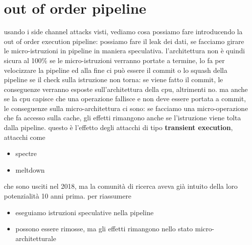 \documentclass[12pt, oneside]{extbook} %
\begin{document}
\section{out of order pipeline}
usando i side channel attacks visti, vediamo cosa possiamo fare introducendo la out of order execution pipeline: possiamo fare il leak dei dati, se facciamo girare le micro-istruzioni in pipeline in maniera speculativa. l'architettura non è quindi sicura al 100\% se le micro-istruzioni verranno portate a termine, lo fa per velocizzare la pipeline ed alla fine ci può essere il commit o lo squash della pipeline se il check sulla istruzione non torna: se viene fatto il commit, le conseguenze verranno esposte sull'architettura della cpu, altrimenti no. ma anche se la cpu capisce che una operazione fallisce e non deve essere portata a commit, le conseguenze sulla micro-architettura ci sono: se facciamo una micro-operazione che fa accesso sulla cache, gli effetti rimangono anche se l'istruzione viene tolta dalla pipeline. questo è l'effetto degli attacchi di tipo \textbf{transient execution}, attacchi come
\begin{itemize}
\item spectre
\item meltdown
\end{itemize}
che sono usciti nel 2018, ma la comunità di ricerca aveva già intuito della loro potenzialità 10 anni prima. per riassumere
\begin{itemize}
\item eseguiamo istruzioni speculative nella pipeline
\item possono essere rimosse, ma gli effetti rimangono nello stato micro-architetturale
\end{itemize}
\end{document}
